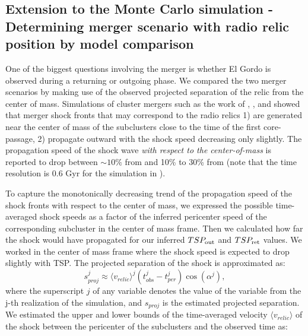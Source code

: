 \documentclass[letterpaper,useAMS,usenatbib]{mn2e}
\begin{document}
%

\subsection{Extension to the Monte Carlo simulation - Determining merger
scenario with radio relic position by model comparison}

One of the biggest questions involving the merger is whether El Gordo is
observed during a returning or outgoing phase. We compared the two merger
scenarios by making use of the observed projected separation of the relic from the
center of mass.
Simulations of cluster mergers such as the work of \citet{Paul2011b},
\citet{VanWeerenRJ2011}, and \citet{Springel2007} showed that merger shock
fronts that may correspond to the radio relics 1) are generated near the
center of mass of the subclusters close to the time of the first
core-passage, 2) propagate outward with the shock speed decreasing only slightly.
The propagation speed of the shock wave {\it with respect to the
center-of-mass} is reported 
to drop between $\sim 10\%$ from \citet{Springel2007} and  
10\% to 30\% from \citet{Paul2011b} (note that the   
 time resolution is 0.6 Gyr for the simulation in \citealt{Paul2011b}).
\par 
To capture the monotonically decreasing trend of the
propagation speed of the shock fronts with respect to the center of
mass, we expressed the possible time-averaged shock speeds as a factor of the inferred
pericenter speed of the corresponding subcluster in the center of mass
 frame. 
Then we calculated how far the shock would have propagated for our inferred
$TSP_{\rm out}$ and $TSP_{\rm ret}$ values. We worked in the center of mass frame where the
shock speed is expected to drop slightly with TSP. 
The projected separation of the shock is approximated as:
\begin{equation}
	s^j_{proj} \approx \langle v_{relic} \rangle^j (t^j_{obs} - t^j_{per})
	\cos(\alpha^j),
	\label{eq:proj_s_model}
\end{equation}
where the superscript $j$ of any variable denotes the value of the
variable from the j-th realization of the simulation, and $s_{proj}$ is the estimated projected
separation. We estimated the upper and lower bounds of the time-averaged velocity
$\langle v_{relic} \rangle$ of the shock between
the pericenter of the subclusters and the observed time as:  
\end{document}
